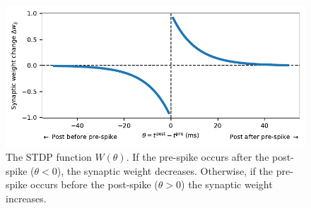 \documentclass[10pt,letterpaper,oneside]{article}
\begin{document}
\begin{figure}
	\centering
	\includegraphics{media/stdp.pdf}
	\caption{The STDP function $W(\theta)$. If the pre-spike occurs after the post-spike ($\theta < 0$), the synaptic weight decreases. Otherwise, if the pre-spike occurs before the post-spike ($\theta > 0$) the synaptic weight increases.}
	\label{fig:stdp}
\end{figure}


\printbibliography
\end{document}
